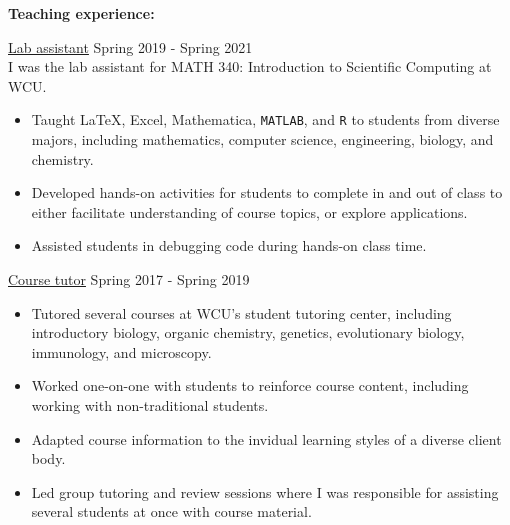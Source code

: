 \textbf{Teaching experience:}

\ul{Lab assistant} \hfill Spring 2019 - Spring 2021 \\
\indent I was the lab assistant for MATH 340: Introduction to Scientific Computing at WCU.
\begin{itemize}
\item Taught \LaTeX{}, Excel, Mathematica, \texttt{MATLAB}, and \texttt{R} to students from diverse majors, including mathematics, computer science, engineering, biology, and chemistry.
\item Developed hands-on activities for students to complete in and out of class to either facilitate understanding of course topics, or explore applications.
\item Assisted students in debugging code during hands-on class time.
\end{itemize}

\ul{Course tutor} \hfill Spring 2017 - Spring 2019
\begin{itemize}
\item Tutored several courses at WCU's student tutoring center, including introductory biology, organic chemistry, genetics, evolutionary biology, immunology, and microscopy.
\item Worked one-on-one with students to reinforce course content, including working with non-traditional students.
\item Adapted course information to the invidual learning styles of a diverse client body.
\item Led group tutoring and review sessions where I was responsible for assisting several students at once with course material.
\end{itemize}